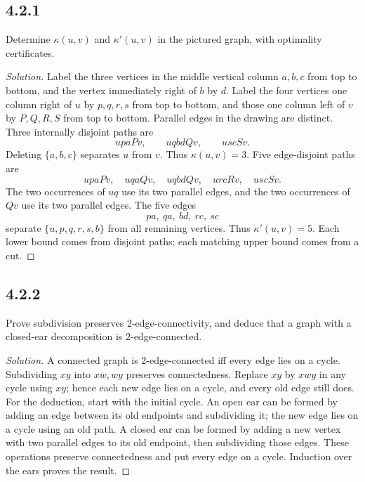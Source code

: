 \documentclass[12pt]{amsart}
\newenvironment{solution}{\begin{proof}[Solution]}{\end{proof}}
\begin{document}
    \subsection*{4.2.1} Determine $\kappa(u,v)$ and $\kappa'(u,v)$ in the pictured graph, with optimality certificates.
    \begin{solution}Label the three vertices in the middle vertical column $a,b,c$ from top to bottom, and the vertex immediately right of $b$ by $d$. Label the four vertices one column right of $u$ by $p,q,r,s$ from top to bottom, and those one column left of $v$ by $P,Q,R,S$ from top to bottom. Parallel edges in the drawing are distinct.
    Three internally disjoint paths are
        \[
            u p a P v,\qquad u q b d Q v,\qquad u s c S v.
        \]
        Deleting $\{a,b,c\}$ separates $u$ from $v$. Thus $\kappa(u,v)=3$.
        Five edge-disjoint paths are
        \[
            u p a P v,\quad u q a Q v,\quad u q b d Q v,
            \quad u r c R v,\quad u s c S v.
        \]
        The two occurrences of $uq$ use its two parallel edges, and the two occurrences of $Qv$ use its two parallel edges. The five edges
        \[
            pa,\ qa,\ bd,\ rc,\ sc
        \]
        separate $\{u,p,q,r,s,b\}$ from all remaining vertices. Thus $\kappa'(u,v)=5$. Each lower bound comes from disjoint paths; each matching upper bound comes from a cut.\end{solution}

    \subsection*{4.2.2} Prove subdivision preserves $2$-edge-connectivity, and deduce that a graph with a closed-ear decomposition is $2$-edge-connected.
    \begin{solution}A connected graph is $2$-edge-connected iff every edge lies on a cycle. Subdividing $xy$ into $xw,wy$ preserves connectedness. Replace $xy$ by $xwy$ in any cycle using $xy$; hence each new edge lies on a cycle, and every old edge still does.
    For the deduction, start with the initial cycle. An open ear can be formed by adding an edge between its old endpoints and subdividing it; the new edge lies on a cycle using an old path. A closed ear can be formed by adding a new vertex with two parallel edges to its old endpoint, then subdividing those edges. These operations preserve connectedness and put every edge on a cycle. Induction over the ears proves the result.\end{solution}
\end{document}
